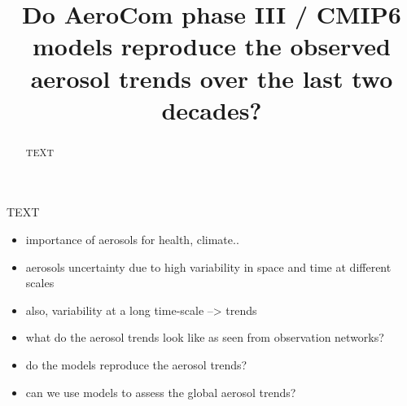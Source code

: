 \documentclass[journal abbreviation, manuscript]{copernicus}
\begin{document}
\title{Do AeroCom phase III / CMIP6 models reproduce the observed aerosol trends over the last two decades?}














\received{}
\pubdiscuss{} %
\revised{}
\accepted{}
\published{}




\maketitle

\tableofcontents

\begin{abstract}
 TEXT
\end{abstract}




\introduction  %
TEXT
\begin{itemize}
 \item importance of aerosols for health, climate..
 \item aerosols uncertainty due to high variability in space and time at different scales
 \item also, variability at a long time-scale --> trends
 \item what do the aerosol trends look like as seen from observation networks?
 \item do the models reproduce the aerosol trends?
 \item can we use models to assess the global aerosol trends?
\end{itemize}
\end{document}

